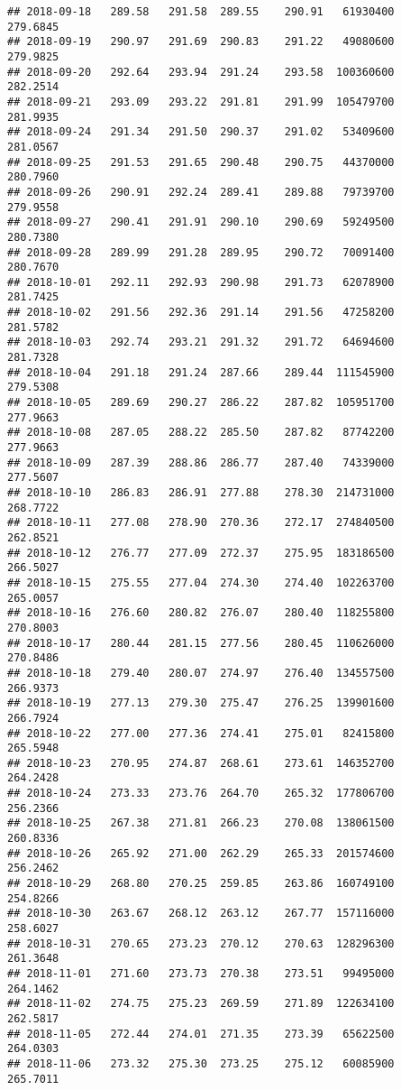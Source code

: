\documentclass[
]{article}
\begin{document}
\begin{verbatim}
## 2018-09-18   289.58   291.58  289.55    290.91   61930400     279.6845
## 2018-09-19   290.97   291.69  290.83    291.22   49080600     279.9825
## 2018-09-20   292.64   293.94  291.24    293.58  100360600     282.2514
## 2018-09-21   293.09   293.22  291.81    291.99  105479700     281.9935
## 2018-09-24   291.34   291.50  290.37    291.02   53409600     281.0567
## 2018-09-25   291.53   291.65  290.48    290.75   44370000     280.7960
## 2018-09-26   290.91   292.24  289.41    289.88   79739700     279.9558
## 2018-09-27   290.41   291.91  290.10    290.69   59249500     280.7380
## 2018-09-28   289.99   291.28  289.95    290.72   70091400     280.7670
## 2018-10-01   292.11   292.93  290.98    291.73   62078900     281.7425
## 2018-10-02   291.56   292.36  291.14    291.56   47258200     281.5782
## 2018-10-03   292.74   293.21  291.32    291.72   64694600     281.7328
## 2018-10-04   291.18   291.24  287.66    289.44  111545900     279.5308
## 2018-10-05   289.69   290.27  286.22    287.82  105951700     277.9663
## 2018-10-08   287.05   288.22  285.50    287.82   87742200     277.9663
## 2018-10-09   287.39   288.86  286.77    287.40   74339000     277.5607
## 2018-10-10   286.83   286.91  277.88    278.30  214731000     268.7722
## 2018-10-11   277.08   278.90  270.36    272.17  274840500     262.8521
## 2018-10-12   276.77   277.09  272.37    275.95  183186500     266.5027
## 2018-10-15   275.55   277.04  274.30    274.40  102263700     265.0057
## 2018-10-16   276.60   280.82  276.07    280.40  118255800     270.8003
## 2018-10-17   280.44   281.15  277.56    280.45  110626000     270.8486
## 2018-10-18   279.40   280.07  274.97    276.40  134557500     266.9373
## 2018-10-19   277.13   279.30  275.47    276.25  139901600     266.7924
## 2018-10-22   277.00   277.36  274.41    275.01   82415800     265.5948
## 2018-10-23   270.95   274.87  268.61    273.61  146352700     264.2428
## 2018-10-24   273.33   273.76  264.70    265.32  177806700     256.2366
## 2018-10-25   267.38   271.81  266.23    270.08  138061500     260.8336
## 2018-10-26   265.92   271.00  262.29    265.33  201574600     256.2462
## 2018-10-29   268.80   270.25  259.85    263.86  160749100     254.8266
## 2018-10-30   263.67   268.12  263.12    267.77  157116000     258.6027
## 2018-10-31   270.65   273.23  270.12    270.63  128296300     261.3648
## 2018-11-01   271.60   273.73  270.38    273.51   99495000     264.1462
## 2018-11-02   274.75   275.23  269.59    271.89  122634100     262.5817
## 2018-11-05   272.44   274.01  271.35    273.39   65622500     264.0303
## 2018-11-06   273.32   275.30  273.25    275.12   60085900     265.7011

\end{verbatim}
\end{document}
